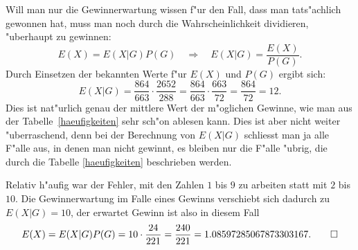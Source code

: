 \begin{loesung}
\begin{teilaufgaben}
Will man nur die Gewinnerwartung wissen f"ur den Fall, dass
man tats"achlich gewonnen hat, muss man noch durch die
Wahrscheinlichkeit dividieren, "uberhaupt zu gewinnen:
\[
E(X)=E(X|G)P(G)\quad\Rightarrow\quad E(X|G)=\frac{E(X)}{P(G)}.
\]
Durch Einsetzen der bekannten Werte f"ur $E(X)$ und $P(G)$
ergibt sich:
\[
E(X|G)
=
\frac{864}{663}\cdot\frac{2652}{288}
=
\frac{864}{663}\cdot\frac{663}{72}
=
\frac{864}{72}=
12.
\]
Dies ist nat"urlich genau der mittlere Wert der m"oglichen
Gewinne, wie man aus der Tabelle~\ref{haeufigkeiten}
sehr sch"on ablesen kann. Dies ist aber nicht weiter
"uberraschend, denn bei der Berechnung von $E(X|G)$
schliesst man ja alle F"alle aus, in denen man nicht
gewinnt, es bleiben nur die F"alle "ubrig, die durch
die Tabelle \ref{haeufigkeiten} beschrieben werden.

Relativ h"aufig war der Fehler, mit den Zahlen $1$ bis $9$
zu arbeiten statt mit $2$ bis $10$. Die Gewinnerwartung
im Falle eines Gewinns verschiebt sich dadurch zu
$E(X|G)=10$, der erwartet Gewinn ist also in diesem Fall
\[
E(X)=E(X|G)P(G)=10\cdot\frac{24}{221}=\frac{240}{221}=
1.08597285067873303167.
\qedhere
\]
\end{teilaufgaben}
\end{loesung}

